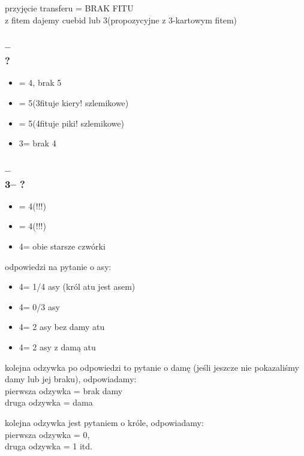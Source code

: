 \documentclass[12pt, a4paper]{article}
\begin{document}
przyjęcie transferu = BRAK FITU\\
z fitem dajemy cuebid lub 3\nt (propozycyjne z 3-kartowym fitem)

\subsubsection*{\alrts{2\nt} -- \alrts{3\clubs}\\
                ?}
\begin{itemize}
    \item \alrts{3\diams} = 4\major, brak 5\major
    \item \alrts{3\hearts} = 5\hearts (3\spades fituje kiery! szlemikowe)
    \item \alrts{3\spades} = 5\spades (4\hearts fituje piki! szlemikowe)
    \item 3\nt = brak 4\major
\end{itemize}

\subsubsection*{\alrts{2\nt} -- \alrts{3\clubs}\\
                3\diams -- ?}
\begin{itemize}
    \item \alrts{3\hearts} = 4\spades (!!!)
    \item \alrts{3\spades} = 4\hearts (!!!)
    \item 4\diams = obie starsze czwórki
\end{itemize}

odpowiedzi na pytanie o asy:\\
\begin{itemize}
    \item 4\clubs = 1/4 asy (król atu jest asem)
    \item 4\diams = 0/3 asy
    \item 4\hearts = 2 asy bez damy atu
    \item 4\spades = 2 asy z damą atu
\end{itemize}

kolejna odzywka po odpowiedzi to pytanie o damę 
(jeśli jeszcze nie pokazaliśmy damy lub jej braku), odpowiadamy:\\
pierwsza odzywka = brak damy\\
druga odzywka = dama

kolejna odzywka jest pytaniem o króle, odpowiadamy:\\
pierwsza odzywka = 0,\\
druga odzywka = 1 itd.
\end{document}
